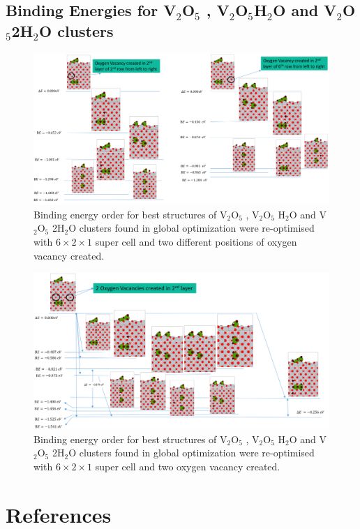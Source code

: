 \documentclass[aip,amsmath,amssymb,reprint, jcp]{revtex4-1}
\begin{document}
\subsection{Binding Energies for V$_2$O$_5$ , V$_2$O$_5$H$_2$O and  V$_2$O$_5$2H$_2$O clusters}
\begin{figure}
\centering
\includegraphics[width=1.0\textwidth]{Binfing_energies_V2O5_2H2O_TiO2_101sur_6by2supercell_1Ov.png}
\caption{Binding energy order for best structures of V$_2$O$_5$ , V$_2$O$_5$ H$_2$O and V$_2$O$_5$ 2H$_2$O clusters found in global optimization were re-optimised with $6 \times 2 \times 1$ super cell  and  two different positions of oxygen vacancy created.}
\label{fig:BE_1Ov}
\end{figure}
\begin{figure}
\centering
\includegraphics[width=1.0\textwidth]{Binfing_energies_V2O5_2H2O_TiO2_101sur_6by2supercell_2Ov.png}
\caption{Binding energy order for best structures of V$_2$O$_5$ , V$_2$O$_5$ H$_2$O and V$_2$O$_5$ 2H$_2$O clusters found in global optimization were re-optimised with $6 \times 2 \times 1$ super cell  and  two oxygen vacancy created.}
\label{fig:BE_1Ov}
\end{figure}

\section{References}

\end{document}
